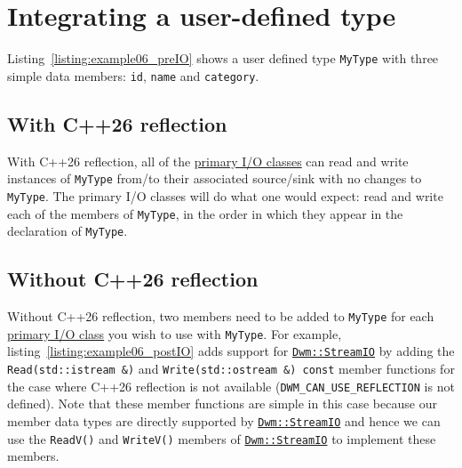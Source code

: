 \begin{minipage}{\textwidth}
  
\end{minipage}

\pagebreak
\section{Integrating a user-defined type}
Listing~\ref{listing:example06_preIO} shows a user defined type
\texttt{MyType} with three simple data members: \texttt{id}, \texttt{name}
and \texttt{category}.

\begin{minipage}{\textwidth}
  
\end{minipage}

\subsection{With C++26 reflection}
With C++26 reflection, all of the
\hyperref[chapter:primaryIOClasses]{primary I/O classes} can read and write
instances of \texttt{MyType} from/to their associated source/sink with no
changes to \texttt{MyType}.  The primary I/O classes will do what one would
expect: read and write each of the members of \texttt{MyType}, in the order
in which they appear in the declaration of \texttt{MyType}.

\subsection{Without C++26 reflection}
Without C++26 reflection, two members need to be added to \texttt{MyType}
for each \hyperref[chapter:primaryIOClasses]{primary I/O class} you wish
to use with \texttt{MyType}.  For example,
listing~\ref{listing:example06_postIO} adds support for
\hyperref[section:DwmStreamIOClass]{\texttt{Dwm::StreamIO}} by adding the
\texttt{Read(std::istream \&)} and \texttt{Write(std::ostream \&) const}
member functions for the case where C++26 reflection is not available
(\texttt{DWM\_CAN\_USE\_REFLECTION} is not defined).  Note that these
member functions are simple in this case because our member data types
are directly supported by
\hyperref[section:DwmStreamIOClass]{\texttt{Dwm::StreamIO}} and hence we
can use the \texttt{ReadV()} and \texttt{WriteV()} members of
\hyperref[section:DwmStreamIOClass]{\texttt{Dwm::StreamIO}} to implement
these members.


